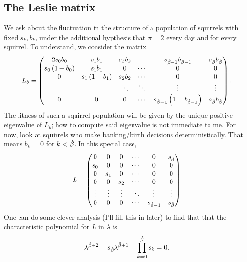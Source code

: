 \subsection{The Leslie matrix}
We ask about the fluctuation in the structure of a population of squirrels with fixed $s_k, b_k$, under
the additional hypthesis that $\pi = 2$ every day and for every squirrel. To
understand, we consider the matrix
$$ L_b = 
\begin{pmatrix}
    2s_0b_0 & s_1b_1 & s_2b_2 & \cdots & s_{\hat{\beta} - 1}b_{\hat{\beta} - 1} & s_{\hat{\beta}}b_{\hat{\beta}} \\
    s_0\left( 1-b_0 \right) & s_1b_1 & 0 & \cdots & 0 & 0 \\
    0 & s_1\left( 1-b_1 \right) & s_2b_2 & \cdots & 0 & 0 \\
    & & \ddots & \ddots & \vdots & \vdots \\
    0 & 0 & 0 & \cdots & s_{\hat{\beta} - 1}\left(1-b_{\hat{\beta}-1}\right) & s_{\hat{\beta}}b_{\hat{\beta}} \\
\end{pmatrix}.
$$
The fitness of such a squirrel population will be given by the unique positive eigenvalue of $L_b$;
how to compute said eigenvalue is not immediate to me. For now, look at squirrels who make banking/birth
decisions deterministically. That means $b_k$ = 0 for $k<\hat{\beta}$. 
In this special case,
$$ L = 
\begin{pmatrix}
    0 & 0 & 0 & \cdots & 0 & s_{\hat{\beta}} \\
    s_0 & 0 & 0 & \cdots & 0 & 0 \\
    0 & s_1 & 0 & \cdots & 0 & 0 \\
    0 & 0 & s_2 & \cdots & 0 & 0 \\
    \vdots & \vdots & \vdots & \ddots & \vdots & \vdots \\
    0 & 0 & 0 & \cdots & s_{\hat{\beta} - 1} & s_{\hat{\beta}} \\
\end{pmatrix}
$$
One can do some clever analysis (I'll fill this in later) to find that that the characteristic polynomial for
$L$ in $\lambda$ is
$$ \lambda^{\hat{\beta} + 2} - s_{\hat{\beta}}\lambda^{\hat{\beta}+1} - \prod\limits_{k = 0}^{\hat{\beta}} s_k = 0. $$

